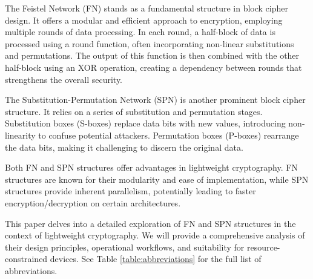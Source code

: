 \documentclass[conference]{IEEEtran}
\begin{document}
The Feistel Network (FN) stands as a fundamental structure in block cipher design. It offers a modular and efficient approach to encryption, employing multiple rounds of data processing. In each round, a half-block of data is processed using a round function, often incorporating non-linear substitutions and permutations. The output of this function is then combined with the other half-block using an XOR operation, creating a dependency between rounds that strengthens the overall security.\cite{FEISTEL}

The Substitution-Permutation Network (SPN) is another prominent block cipher structure. It relies on a series of substitution and permutation stages. Substitution boxes (S-boxes) replace data bits with new values, introducing non-linearity to confuse potential attackers. Permutation boxes (P-boxes) rearrange the data bits, making it challenging to discern the original data.\cite{heys1996substitution}

Both FN and SPN structures offer advantages in lightweight cryptography. FN structures are known for their modularity and ease of implementation, while SPN structures provide inherent parallelism, potentially leading to faster encryption/decryption on certain architectures.

This paper delves into a detailed exploration of FN and SPN structures in the context of lightweight cryptography. We will provide a comprehensive analysis of their design principles, operational workflows, and suitability for resource-constrained devices. See Table \ref{table:abbreviations} for the full list of abbreviations.
\end{document}
